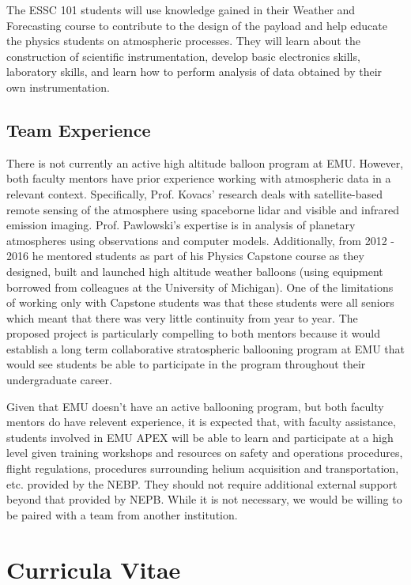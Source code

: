 \documentclass[12pt]{article}
\begin{document}
The ESSC 101 students will use knowledge gained
in their Weather and Forecasting course to contribute to the design of the payload and help educate
the physics students on atmospheric processes. They will learn about
the construction of scientific instrumentation, develop basic electronics skills, laboratory skills,
and learn how to perform analysis of data obtained by their own instrumentation.

\subsection{Team Experience}
There is not currently an active high altitude balloon program at EMU. However, both faculty mentors have
prior experience working with atmospheric data in a relevant context. Specifically,
Prof. Kovacs’ research deals with satellite-based remote sensing of the atmosphere using spaceborne lidar and visible and infrared emission imaging.
Prof. Pawlowski's expertise is in analysis of planetary atmospheres using observations
and computer models. Additionally, from 2012 - 2016 he
mentored students as part of his Physics
Capstone course as they designed, built and launched high altitude weather balloons (using
equipment borrowed from colleagues at the University of Michigan). One of the
limitations of working only with Capstone students
was that these students were all seniors which meant that there was very little continuity from year to year.
The proposed project is particularly compelling to both mentors
because it would establish a long term collaborative
stratospheric ballooning program at EMU that would see students be able to
participate in the program throughout their undergraduate career.

Given that EMU doesn't have an active ballooning program, but both faculty mentors
do have relevent experience, it is expected that, with faculty assistance, students involved in EMU APEX will be able to learn
and participate at a high level given training workshops and resources on safety and operations procedures, flight regulations,
procedures surrounding helium acquisition and transportation, etc. provided by the NEBP.
They should not require additional external support beyond that provided by NEPB.
While it is not necessary, we would be willing to be paired with a team from
another institution.



\newpage
\section{Curricula Vitae}

\end{document}
